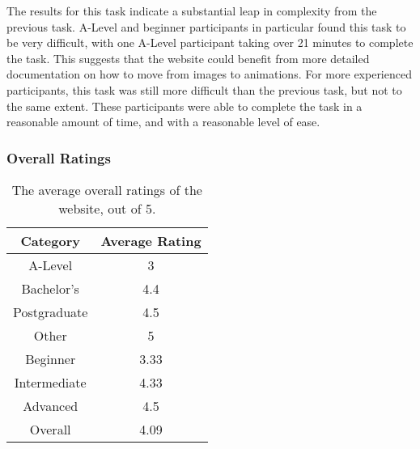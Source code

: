 \documentclass[../main.tex]{subfiles}
\begin{document}
                The results for this task indicate a substantial leap in complexity from the
                    previous task.
                A-Level and beginner participants in particular found this task to be very
                    difficult, with one A-Level participant taking over 21 minutes to complete the
                    task.
                This suggests that the website could benefit from more detailed documentation
                    on how to move from images to animations.
                For more experienced participants, this task was still more difficult than the
                    previous task, but not to the same extent.
                These participants were able to complete the task in a reasonable amount of
                    time, and with a reasonable level of ease.

            \subsubsection{Overall Ratings}
                \begin{table}[H]
                    \centering
                    \begin{tabular}{c|c}
                        \textbf{Category} & \textbf{Average Rating} \\
                        \hline
                        A-Level           & 3                       \\
                        Bachelor's        & 4.4                     \\
                        Postgraduate      & 4.5                     \\
                        Other             & 5                       \\
                        \hline
                        Beginner          & 3.33                    \\
                        Intermediate      & 4.33                    \\
                        Advanced          & 4.5                     \\
                        \hline
                        Overall           & 4.09                    \\
                    \end{tabular}
                    \caption{The average overall ratings of the website, out of 5.}
                \end{table}
\end{document}
